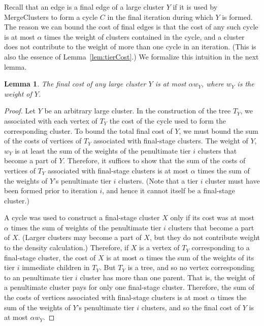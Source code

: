 \documentclass[11pt]{article}
\newtheorem{lemma}{Lemma}[section]
\begin{document}
Recall that an edge is a final edge of a large cluster $Y$ if it is
used by {\sc MergeClusters} to form a cycle $C$ in the final iteration
during which $Y$ is formed. The reason we can bound the cost of final
edges is that the cost of any such cycle is at most $\alpha$ times the
weight of clusters contained in the cycle, and a cluster does not
contribute to the weight of more than one cycle in an iteration. (This
is also the essence of Lemma~\ref{lem:tierCost}.) We formalize this
intuition in the next lemma.

\begin{lemma}\label{lem:final}
  The final cost of any large cluster $Y$ is at most $\alpha w_Y$,
  where $w_Y$ is the weight of $Y$.
\end{lemma}
\begin{proof}
  Let $Y$ be an arbitrary large cluster. In the construction of the
  tree $T_Y$, we associated with each vertex of $T_Y$ the cost of the
  cycle used to form the corresponding cluster. To bound the total
  final cost of $Y$, we must bound the sum of the costs of vertices of
  $T_Y$ associated with final-stage clusters.  The weight of $Y$,
  $w_Y$ is at least the sum of the weights of the penultimate tier $i$
  clusters that become a part of $Y$. Therefore, it suffices to show
  that the sum of the costs of vertices of $T_Y$ associated with
  final-stage clusters is at most $\alpha$ times the sum of the
  weights of $Y$'s penultimate tier $i$ clusters. (Note that a tier
  $i$ cluster must have been formed prior to iteration $i$, and hence
  it cannot itself be a final-stage cluster.)

  A cycle was used to construct a final-stage cluster $X$ only if its
  cost was at most $\alpha$ times the sum of weights of the
  penultimate tier $i$ clusters that become a part of $X$. (Larger
  clusters may become a part of $X$, but they do not contribute weight
  to the density calculation.)  Therefore, if $X$ is a vertex of $T_Y$
  corresponding to a final-stage cluster, the cost of $X$ is at most
  $\alpha$ times the sum of the weights of its tier $i$ immediate
  children in $T_Y$. But $T_Y$ is a tree, and so no vertex
  corresponding to an penultimate tier $i$ cluster has more than one
  parent. That is, the weight of a penultimate cluster pays for only
  one final-stage cluster. Therefore, the sum of the costs of vertices
  associated with final-stage clusters is at most $\alpha$ times the
  sum of the weights of $Y$'s penultimate tier $i$ clusters, and so
  the final cost of $Y$ is at most $\alpha w_Y$.
\end{proof}
\end{document}
